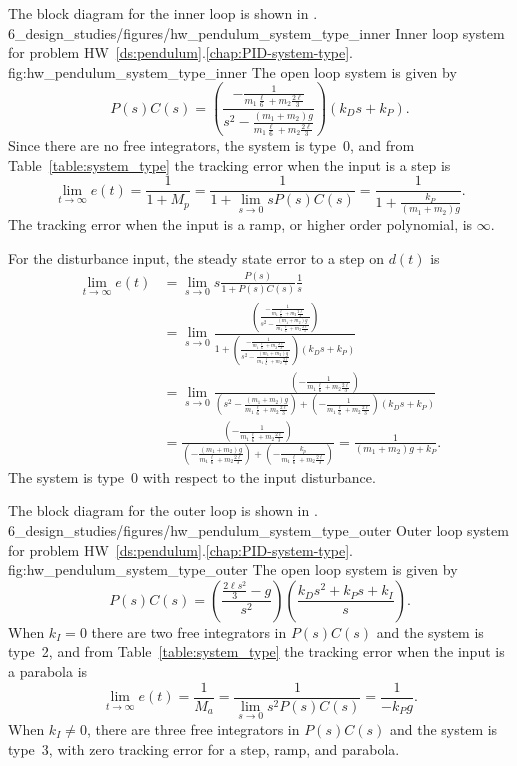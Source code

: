 
The block diagram for the inner loop is shown in .
	{6_design_studies/figures/hw_pendulum_system_type_inner}
	{Inner loop system for problem HW~\ref{ds:pendulum}.\ref{chap:PID-system-type}.}
	{fig:hw_pendulum_system_type_inner}
The open loop system is given by
\[
P(s)C(s) = \left(\frac{-\frac{1}{m_1\frac{\ell}{6}+m_2\frac{2\ell}{3}}}{s^2-\frac{(m_1+m_2)g}{m_1\frac{\ell}{6}+m_2\frac{2\ell}{3}}}\right)\left(k_Ds+k_P\right).
\]
Since there are no free integrators, the system is type~0, and from Table~\ref{table:system_type} the tracking error when the input is a step is \[
\lim_{t\to\infty}e(t) = \frac{1}{1+M_p} = \frac{1}{1+\lim_{s\to 0} sP(s)C(s)} = \frac{1}{1+\frac{k_P}{(m_1+m_2)g}}.
\]
The tracking error when the input is a ramp, or higher order polynomial, is $\infty$.

For the disturbance input, the steady state error to a step on $d(t)$ is
\begin{align*}
\lim_{t\to\infty}e(t) &= \lim_{s\to 0}s\frac{P(s)}{1+P(s)C(s)}\frac{1}{s} \\
&= \lim_{s\to 0} \frac{\left(\frac{-\frac{1}{m_1\frac{\ell}{6}+m_2\frac{2\ell}{3}}}{s^2-\frac{(m_1+m_2)g}{m_1\frac{\ell}{6}+m_2\frac{2\ell}{3}}}\right)}{1+\left(\frac{-\frac{1}{m_1\frac{\ell}{6}+m_2\frac{2\ell}{3}}}{s^2-\frac{(m_1+m_2)g}{m_1\frac{\ell}{6}+m_2\frac{2\ell}{3}}}\right)\left(k_Ds+k_P\right)} \\
&= \lim_{s\to 0} \frac{\left(-\frac{1}{m_1\frac{\ell}{6}+m_2\frac{2\ell}{3}}\right)}{\left(s^2-\frac{(m_1+m_2)g}{m_1\frac{\ell}{6}+m_2\frac{2\ell}{3}}\right)+\left(-\frac{1}{m_1\frac{\ell}{6}+m_2\frac{2\ell}{3}}\right)\left(k_Ds+k_P\right)} \\
&=\frac{\left(-\frac{1}{m_1\frac{\ell}{6}+m_2\frac{2\ell}{3}}\right)}{\left(-\frac{(m_1+m_2)g}{m_1\frac{\ell}{6}+m_2\frac{2\ell}{3}}\right)+\left(-\frac{k_p}{m_1\frac{\ell}{6}+m_2\frac{2\ell}{3}}\right)} 
= \frac{1}{(m_1+m_2)g+k_P}.
\end{align*}
The system is type~0 with respect to the input disturbance.

The block diagram for the outer loop is shown in .
	{6_design_studies/figures/hw_pendulum_system_type_outer}
	{Outer loop system for problem HW~\ref{ds:pendulum}.\ref{chap:PID-system-type}.}
	{fig:hw_pendulum_system_type_outer}
The open loop system is given by
\[
P(s)C(s) = \left(\frac{\frac{2\ell s^2}{3}-g}{s^2}\right)\left(\frac{k_Ds^2+k_Ps+k_I}{s}\right).
\]
When $k_I=0$ there are two free integrators in $P(s)C(s)$ and the system is type~2, and from Table~\ref{table:system_type} the tracking error when the input is a parabola is \[
\lim_{t\to\infty}e(t) = \frac{1}{M_a} = \frac{1}{\lim_{s\to 0} s^2P(s)C(s)} = \frac{1}{-k_Pg}.
\]
When $k_I\neq 0$, there are three free integrators in $P(s)C(s)$ and the system is type~3, with zero tracking error for a step, ramp, and parabola.

